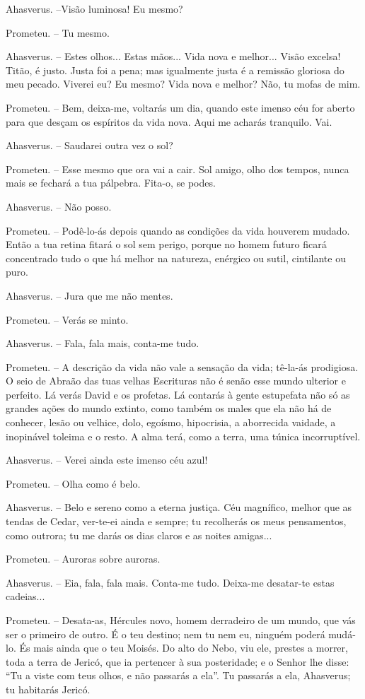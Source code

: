 Ahasverus. --Visão luminosa! Eu mesmo?

Prometeu. -- Tu mesmo.

Ahasverus. -- Estes olhos... Estas mãos... Vida nova e melhor... Visão
excelsa! Titão, é justo. Justa foi a pena; mas igualmente justa é a
remissão gloriosa do meu pecado. Viverei eu? Eu mesmo? Vida nova e
melhor? Não, tu mofas de mim.

Prometeu. -- Bem, deixa-me, voltarás um dia, quando este imenso céu for
aberto para que desçam os espíritos da vida nova. Aqui me acharás
tranquilo. Vai.

Ahasverus. -- Saudarei outra vez o sol?

Prometeu. -- Esse mesmo que ora vai a cair. Sol amigo, olho dos tempos,
nunca mais se fechará a tua pálpebra. Fita-o, se podes.

Ahasverus. -- Não posso.

Prometeu. -- Podê-lo-ás depois quando as condições da vida houverem
mudado. Então a tua retina fitará o sol sem perigo, porque no homem
futuro ficará concentrado tudo o que há melhor na natureza, enérgico ou
sutil, cintilante ou puro.

Ahasverus. -- Jura que me não mentes.

Prometeu. -- Verás se minto.

Ahasverus. -- Fala, fala mais, conta-me tudo.

Prometeu. -- A descrição da vida não vale a sensação da vida; tê-la-ás
prodigiosa. O seio de Abraão das tuas velhas Escrituras não é senão esse
mundo ulterior e perfeito. Lá verás David e os profetas. Lá contarás à
gente estupefata não só as grandes ações do mundo extinto, como também
os males que ela não há de conhecer, lesão ou velhice, dolo, egoísmo,
hipocrisia, a aborrecida vaidade, a inopinável toleima e o resto. A alma
terá, como a terra, uma túnica incorruptível.

Ahasverus. -- Verei ainda este imenso céu azul!

Prometeu. -- Olha como é belo.

Ahasverus. -- Belo e sereno como a eterna justiça. Céu magnífico, melhor
que as tendas de Cedar, ver-te-ei ainda e sempre; tu recolherás os meus
pensamentos, como outrora; tu me darás os dias claros e as noites
amigas...

Prometeu. -- Auroras sobre auroras.

Ahasverus. -- Eia, fala, fala mais. Conta-me tudo. Deixa-me desatar-te
estas cadeias...

Prometeu. -- Desata-as, Hércules novo, homem derradeiro de um mundo, que
vás ser o primeiro de outro. É o teu destino; nem tu nem eu, ninguém
poderá mudá-lo. És mais ainda que o teu Moisés. Do alto do Nebo, viu
ele, prestes a morrer, toda a terra de Jericó, que ia pertencer à sua
posteridade; e o Senhor lhe disse: ``Tu a viste com teus olhos, e não
passarás a ela''. Tu passarás a ela, Ahasverus; tu habitarás Jericó.

